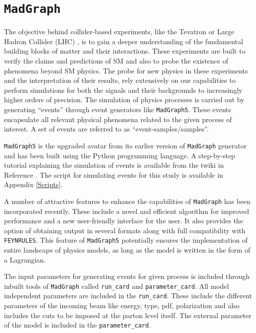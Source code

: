 \section{\texttt{MadGraph}}\label{MadG5}
The objective behind collider-based experiments, like the Tevatron \cite{Tevatron} or Large Hadron Collider (LHC) \cite{LHC}, is to gain a deeper understanding of the fundamental building blocks of matter and their interactions. These experiments are built to verify the claims and predictions of SM and also to probe the existence of phenomena beyond SM physics. The probe for new physics in these experiments and the interpretation of their results, rely extensively on our capabilities to perform simulations for both the signals and their backgrounds to increasingly higher orders of precision. The simulation of physics processes is carried out by generating ``events''  through event generators like \texttt{MadGraph5}. These events encapsulate all relevant physical phenomena related to the given process of interest. A set of events are referred to as ``event-samples/samples''. 


\texttt{MadGraph5} \cite{MG5} is the upgraded avatar from its earlier version of \texttt{MadGraph} generator \cite{Maltoni-MG} and has been built using the Python programming language. A step-by-step tutorial explaining the simulation of events is available from the twiki in Reference \cite{MG5-Tutorial}. The script for simulating events for this study is available in Appendix \ref{Scripts}. 

A number of attractive features to enhance the capabilities of \texttt{MadGraph} has been incorporated recently. These include a novel and efficient algorithm for improved performance and a new user-friendly interface for the user. It also provides the option of obtaining output in several formats along with full compatibility with \texttt{{\Large F}EYN{\Large R}ULES}. This feature of \texttt{MadGraph5} potentially ensures the implementation of entire landscape of physics models, as long as the model is written in the form of a Lagrangian. 

The input parameters for generating events for given process is included through inbuilt tools of \texttt{MadGraph} called \texttt{run\_card} and \texttt{parameter\_card}. All model independent parameters are included in the \texttt{run\_card}. 
These include the different parameters of the incoming beam like energy, type, pdf, polarization and also includes the cuts to be imposed at the parton level itself. The external parameter of the model is included in the \texttt{parameter\_card}. 


